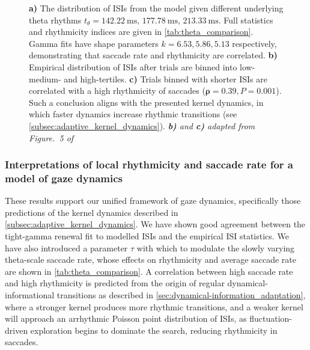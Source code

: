 \begin{figure}[htbp!]
	\centering
	\begin{subfigure}[T]{0.38\textwidth}
		\centering
		\label{fig:model_plot}
	\end{subfigure}
	\hfill
	\begin{subfigure}[T]{0.29\textwidth}
		\centering
		\label{fig:gamma_fits}
	\end{subfigure}
	\hfill
	\begin{subfigure}[T]{0.29\textwidth}
		\centering
		\label{fig:rate-RCRI}
	\end{subfigure}
    \vspace{-2.2em}
	\caption{\textbf{a)} The distribution of ISIs from the model given different underlying theta rhythms $t_{\theta} = \qty{142.22}{\milli \second}, \, \qty{177.78}{\milli \second}, \, \qty{213.33}{\milli \second}$. Full statistics and rhythmicity indices are given in \cref{tab:theta_comparison}. Gamma fits have shape parameters $k=6.53, 5.86, 5.13$ respectively, demonstrating that saccade rate and rhythmicity are correlated. \textbf{b)} Empirical distribution of ISIs after trials are binned into low- medium- and high-tertiles. \textbf{c)} Trials binned with shorter ISIs are correlated with a high rhythmicity of saccades ($\mathbf{\rho} = 0.39, P=0.001$). Such a conclusion aligns with the presented kernel dynamics, in which faster dynamics increase rhythmic transitions (see \cref{subsec:adaptive_kernel_dynamics}). \textit{\textbf{b)} and \textbf{c)} adapted from Figure.~5 of \textcite{naher_primate_saccades}}}
	\label{fig:local_rhythmicity}
\end{figure}
\subsubsection*{Interpretations of local rhythmicity and saccade rate for a model of gaze dynamics}
These results support our unified framework of gaze dynamics, specifically those predictions of the kernel dynamics described in \cref{subsec:adaptive_kernel_dynamics}. We have shown good agreement between the tight-gamma renewal fit to modelled ISIs and the empirical ISI statistics. We have also introduced a parameter $\tau$ with which to modulate the slowly varying theta-scale saccade rate, whose effects on rhythmicity and average saccade rate are shown in \cref{tab:theta_comparison}. A correlation between high saccade rate and high rhythmicity is predicted from the origin of regular dynamical-informational transitions as described in \cref{sec:dynamical-information_adaptation}, where a stronger kernel produces more rhythmic transitions, and a weaker kernel will approach an arrhythmic Poisson point distribution of ISIs, as fluctuation-driven exploration begins to dominate the search, reducing rhythmicity in saccades.